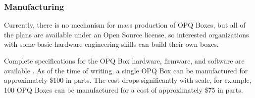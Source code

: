 \subsubsection{Manufacturing}

Currently, there is no mechanism for mass production of OPQ Boxes, but all of the plans are available under an Open Source license, so interested organizations with some basic hardware engineering skills can build their own boxes.

Complete specifications for the OPQ Box hardware, firmware, and software are available \cite{negrashov_opq_2020}. As of the time of writing, a single OPQ Box can be manufactured for approximately \$100 in parts. The cost drops significantly with scale, for example, 100 OPQ Boxes can be manufactured for a cost of approximately \$75 in parts.






